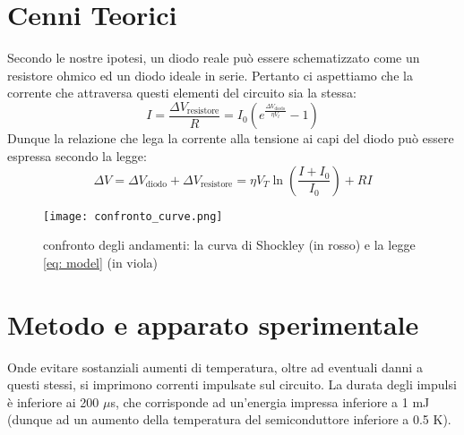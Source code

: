 \documentclass{article}[a4paper, oneside, 11pt]
\begin{document}
\section{Cenni Teorici}
Secondo le nostre ipotesi, un diodo reale può essere schematizzato come un
resistore ohmico %
ed un diodo ideale in serie. Pertanto ci aspettiamo che la corrente che
attraversa questi elementi del circuito sia la stessa:
\begin{equation}
	I = \frac{\Delta V_{\text{resistore}}}{R} =
	I_0 \left( e^{\frac{\Delta V_{\text{diodo}}}{\eta V_t}} - 1\right)
\end{equation}
Dunque la relazione che lega la corrente alla tensione ai capi del diodo può 
essere espressa secondo la legge:
\begin{equation}\label{eq: model}
	\Delta V = \Delta V_{\text{diodo}} + \Delta V_{\text{resistore}} =
	\eta V_T \ln{\left(\frac{I+I_0}{I_0}\right)} + RI
\end{equation}
\begin{figure}[!ht]
	\centering 
 		\texttt{[image: confronto\_curve.png]}
 	\caption{confronto degli andamenti: la curva di Shockley (in rosso) e la 
	legge \eqref{eq: model} (in viola)}
\end{figure}

\section{Metodo e apparato sperimentale}
Onde evitare sostanziali aumenti di temperatura, oltre ad eventuali danni
a questi stessi, si imprimono correnti impulsate sul circuito. 
La durata degli impulsi è inferiore ai 200 $\mu$s, che corrisponde ad
un'energia impressa inferiore a 1 mJ (dunque ad un aumento della temperatura
del semiconduttore inferiore a 0.5 K).
\end{document}
